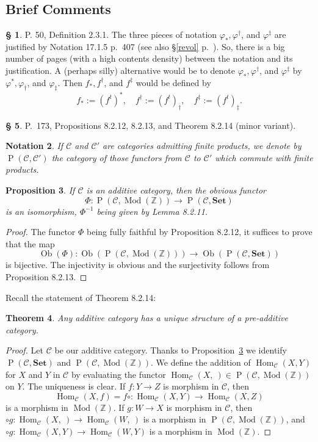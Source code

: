 \documentclass[12pt]{article}
\newtheorem{thm}{Theorem}
\newtheorem{prop}[thm]{Proposition}
\newtheorem{nota}[thm]{Notation}
\theoremstyle{remark}
\theoremstyle{definition}
\newtheorem{s}[thm]{\S}
\newcommand{\C}{\mathcal C}
\newcommand{\oo}{\operatorname}
\newcommand{\Set}{\mathbf{Set}}
\newcommand{\mv}{ (minor variant)}
\DeclareMathOperator{\Hom}{Hom}%
\DeclareMathOperator{\Mod}{Mod}
\begin{document}
\subsection{Brief Comments} %
%
\begin{s}\label{231}
P. 50, Definition 2.3.1. The three pieces of notation $\varphi_*,\varphi^\dagger$, and $\varphi^\ddagger$ are justified by Notation 17.1.5 p.~407 (see also \S\ref{revol} p.~\pageref{revol}). So, there is a big number of pages (with a high contents density) between the notation and its justification. A (perhaps silly) alternative would be to denote $\varphi_*,\varphi^\dagger$, and $\varphi^\ddagger$ by $\varphi^*,\varphi_\dagger$, and $\varphi_\ddagger$. Then $f_*,f^\dagger$, and $f^\ddagger$ would be defined by 
$$
f_*:=(f^t)^*,\quad f^\dagger:=(f^t)_\dagger,\quad f^\ddagger:=(f^t)_\ddagger.
$$
\end{s}
%
%
\begin{s} 
P.~173, Propositions 8.2.12, 8.2.13, and Theorem 8.2.14 \mv. 
\begin{nota}
If $\C$ and $\C'$ are categories admitting finite products, we denote by $\oo P(\C,\C')$ the category of those functors from $\C$ to $\C'$ which commute with finite products.
\end{nota}
%
\begin{prop}\label{8.2.12}
If $\C$ is an additive category, then the obvious functor 
$$
\Phi:\oo P(\C,\Mod(\mathbb Z))\to\oo P(\C,\Set)
$$ 
is an isomorphism, $\Phi^{-1}$ being given by Lemma 8.2.11.
\end{prop}
%
\begin{proof}
The functor $\Phi$ being fully faithful by Proposition 8.2.12, it suffices to prove that the map 
$$
\oo{Ob}(\Phi):\oo{Ob}(\oo P(\C,\Mod(\mathbb Z)))\to\oo{Ob}(\oo P(\C,\Set))
$$ 
is bijective. The injectivity is obvious and the surjectivity follows from Proposition 8.2.13.
\end{proof}

Recall the statement of Theorem 8.2.14:
%
\begin{thm}
Any additive category has a unique structure of a pre-additive category.
\end{thm}
%
\begin{proof}
Let $\C$ be our additive category. Thanks to Proposition~\ref{8.2.12} we identify $\oo P(\C,\Set)$ and $\oo P(\C,\Mod(\mathbb Z))$. We define the addition of $\Hom_\C(X,Y)$ for $X$ and $Y$ in $\C$ by evaluating the functor $\Hom_\C(X,\ )\in\oo P(\C,\Mod(\mathbb Z))$ on $Y$. The uniqueness is clear. If $f:Y\to Z$ is morphism in $\C$, then 
$$
\Hom_\C(X,f)=f\circ:\Hom_\C(X,Y)\to\Hom_\C(X,Z)
$$ 
is a morphism in $\Mod(\mathbb Z)$. If $g:W\to X$ is morphism in $\C$, then $\circ g:\Hom_\C(X,\ )\to\Hom_\C(W,\ )$ is a morphism in $\oo P(\C,\Mod(\mathbb Z))$, and $\circ g:\Hom_\C(X,Y)\to\Hom_\C(W,Y)$ is a morphism in $\Mod(\mathbb Z)$.
\end{proof}
\end{s}
\end{document}
